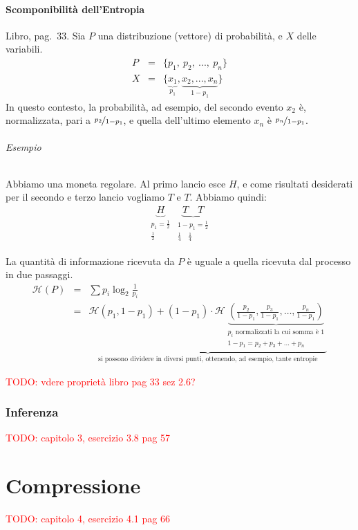 \subsubsection{Scomponibilità dell'Entropia}
Libro, pag.~33. Sia $P$ una distribuzione (vettore) di probabilità, e $X$ delle variabili.
\begin{eqnarray*}
    P &=& \{ p_1,~p_2,~...,~p_n\}\\
    X &=& \{ \underbrace{x_1}_{p_1},\underbrace{x_2,...,x_n}_{1-p_1}\}
\end{eqnarray*}
In questo contesto, la probabilità, ad esempio, del secondo evento $x_2$ è, normalizzata, pari a $\nicefrac{p_2}{1-p_1}$, e quella dell'ultimo elemento $x_n$ è $\nicefrac{p_n}{1-p_1}$.

\subparagraph{Esempio} Abbiamo una moneta regolare. Al primo lancio esce $H$, e come risultati desiderati per il secondo e terzo lancio vogliamo $T$ e $T$. Abbiamo quindi:
\begin{eqnarray*}
    \underbrace{H}_{\substack{p_1=\frac{1}{2}\\\frac{1}{2}}}~\underbrace{T\quad T}_{\substack{1-p_1=\frac{1}{2}\\\frac{1}{4}\quad\frac{1}{4}}}
\end{eqnarray*}

La quantità di informazione ricevuta da $P$ è uguale a quella ricevuta dal processo in due passaggi.
\begin{eqnarray*}
    \mathcal{H}(P)  & = & \sum p_i\log_2\frac{1}{p_i}\\
                    & = & \underbrace{\mathcal{H}(p_1,1-p_1)+(1-p_1)\cdot\mathcal{H}\underbrace{\left(\frac{p_2}{1-p_1},\frac{p_3}{1-p_1},\dots,\frac{p_n}{1-p_1}\right)}_{\substack{\text{$p_i$ normalizzati la cui somma è 1}\\1-p_1=p_2+p_3+\dots+p_n}}}_{\text{si possono dividere in diversi punti, ottenendo, ad esempio, tante entropie}}
\end{eqnarray*}

\textcolor{Red}{TODO: vdere proprietà libro pag 33 sez 2.6?}


\subsection{Inferenza}
\textcolor{Red}{TODO: capitolo 3, esercizio 3.8 pag 57}


\chapter{Compressione}
\textcolor{Red}{TODO: capitolo 4, esercizio 4.1 pag 66}



